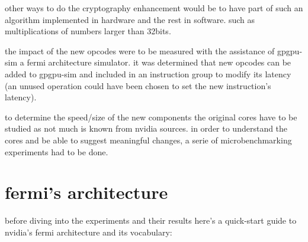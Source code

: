 \documentclass{report}
\begin{document}
    other ways to do the cryptography enhancement would be to have part of such
    an algorithm implemented in hardware and the rest in software.
    such as multiplications of numbers larger than 32bits.
    

    the impact of the new opcodes were to be measured with the assistance of
    gpgpu-sim\cite{gpgpusim09} a fermi architecture simulator. it was determined
    that new opcodes can be added to gpgpu-sim and included in an instruction group
    to modify its latency (an unused operation could have been chosen to set the new
    instruction's latency).

    to determine the speed/size of the new components the original cores have to
    be studied as not much is known from nvidia sources. in order to understand 
    the cores and be able to suggest meaningful changes, a serie of microbenchmarking 
    experiments had to be done. 


\chapter{fermi's architecture}
    before diving into the experiments and their results here's a quick-start
    guide to nvidia's fermi architecture and its vocabulary:
\end{document}

